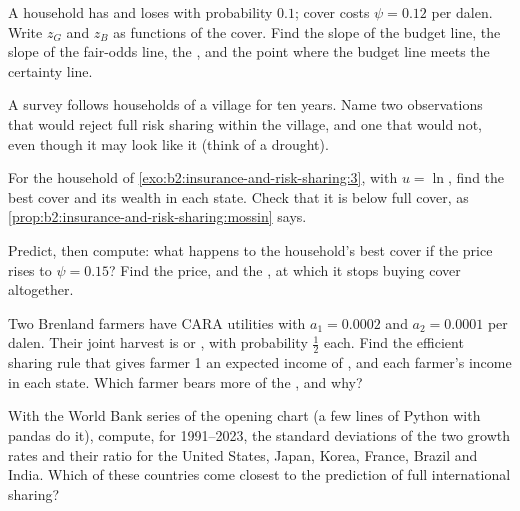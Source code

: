 \begin{exercise}[$\star$]\label{exo:b2:insurance-and-risk-sharing:3}
A household has  and loses  with probability $0.1$; cover costs $\psi = 0.12$ per
dalen. Write $z_G$ and $z_B$ as functions of the cover. Find the slope of the budget line, the slope of
the fair-odds line, the , and the point where the budget line meets the certainty line.
\end{exercise}

\begin{exercise}[$\star$]\label{exo:b2:insurance-and-risk-sharing:4}
A survey follows households of a village for ten years. Name two observations that would reject full
risk sharing within the village, and one that would not, even though it may look like it (think of a
drought).
\end{exercise}

\begin{exercise}[$\star\star$]\label{exo:b2:insurance-and-risk-sharing:5}
For the household of \cref{exo:b2:insurance-and-risk-sharing:3}, with $u = \ln$, find the best cover
and its wealth in each state. Check that it is below full cover, as
\cref{prop:b2:insurance-and-risk-sharing:mossin} says.
\end{exercise}

\begin{exercise}[$\star\star$]\label{exo:b2:insurance-and-risk-sharing:6}
Predict, then compute: what happens to the household's best cover if the price rises to $\psi = 0.15$?
Find the price, and the , at which it stops buying cover altogether.
\end{exercise}

\begin{exercise}[$\star\star$]\label{exo:b2:insurance-and-risk-sharing:7}
Two Brenland farmers have CARA utilities with $a_1 = \num{0.0002}$ and $a_2 = \num{0.0001}$ per dalen.
Their joint harvest is  or , with probability $\tfrac12$ each. Find the
efficient sharing rule that gives farmer 1 an expected income of , and each farmer's
income in each state. Which farmer bears more of the , and why?
\end{exercise}

\begin{exercise}[$\star\star$]\label{exo:b2:insurance-and-risk-sharing:8}
With the World Bank series of the opening chart (a few lines of Python with pandas do it), compute, for
1991--2023, the standard deviations of the two growth rates and their ratio for the United States,
Japan, Korea, France, Brazil and India. Which of these countries come closest to the prediction of full
international sharing?
\end{exercise}


